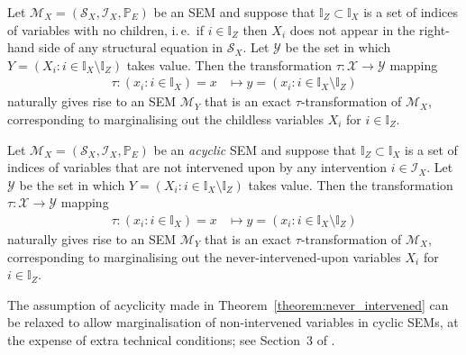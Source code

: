 \medskip

\begin{theorem}\label{theorem:childless}
Let $\mathcal{M}_X=(\mathcal{S}_X,\mathcal{I}_X,\mathbb{P}_E)$ be an SEM and suppose that ${\mathbb{I}_Z\subset\mathbb{I}_X}$ is a set of indices of variables with no children, i.\,e.\ if $i\in\mathbb{I}_Z$ then $X_i$ does not appear in the right-hand side of any structural equation in $\mathcal{S}_X$.
Let $\mathcal{Y}$ be the set in which $Y = \left( X_i: i\in\mathbb{I}_X\setminus \mathbb{I}_Z \right)$ takes value.
Then the transformation $\tau: \mathcal{X} \to \mathcal{Y}$ mapping
\begin{align*}
   \tau: \left( x_i: i\in\mathbb{I}_X \right) = x &\mapsto y = \left( x_i: i\in\mathbb{I}_X\setminus \mathbb{I}_Z \right)
\end{align*}
naturally gives rise to an SEM $\mathcal{M}_Y$ that is an exact $\tau$-transformation of $\mathcal{M}_X$, corresponding to marginalising out the childless variables $X_i$ for $i\in\mathbb{I}_Z$.
\end{theorem}



\medskip


\begin{theorem}\label{theorem:never_intervened}
Let $\mathcal{M}_X=(\mathcal{S}_X,\mathcal{I}_X,\mathbb{P}_E)$ be an \emph{acyclic} SEM and suppose that ${\mathbb{I}_Z\subset\mathbb{I}_X}$ is a set of indices of variables that are not intervened upon by any intervention $i\in\mathcal{I}_X$.
Let $\mathcal{Y}$ be the set in which $Y = \left( X_i: i\in\mathbb{I}_X\setminus \mathbb{I}_Z \right)$ takes value.
Then the transformation $\tau: \mathcal{X} \to \mathcal{Y}$ mapping
\begin{align*}
   \tau: \left( x_i: i\in\mathbb{I}_X \right) = x &\mapsto y = \left( x_i: i\in\mathbb{I}_X\setminus \mathbb{I}_Z \right)
\end{align*}
naturally gives rise to an SEM $\mathcal{M}_Y$ that is an exact $\tau$-transformation of $\mathcal{M}_X$, corresponding to marginalising out the never-intervened-upon variables $X_i$ for $i\in\mathbb{I}_Z$.
\end{theorem}

\medskip

The assumption of acyclicity made in Theorem~\ref{theorem:never_intervened} can be relaxed to allow marginalisation of non-intervened variables in cyclic SEMs, at the expense of extra technical conditions; see Section~3 of \cite{bongers2016structural}.

